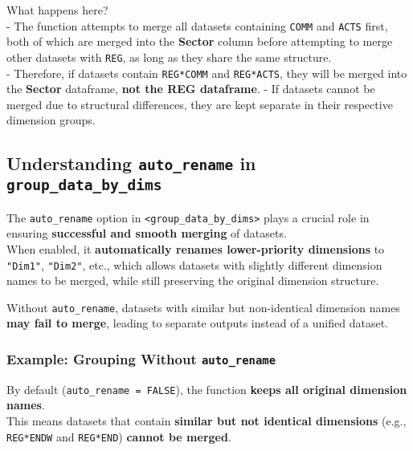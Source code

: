 \documentclass[
]{article}
\begin{document}
What happens here?\\
- The function attempts to merge all datasets containing \texttt{COMM}
and \texttt{ACTS} first, both of which are merged into the
\textbf{Sector} column before attempting to merge other datasets with
\texttt{REG}, as long as they share the same structure.\\
- Therefore, if datasets contain \texttt{REG*COMM} and
\texttt{REG*ACTS}, they will be merged into the \textbf{Sector}
dataframe, \textbf{not the REG dataframe}. - If datasets cannot be
merged due to structural differences, they are kept separate in their
respective dimension groups.

\subsection{\texorpdfstring{\textbf{Understanding \texttt{auto\_rename}
in
\texttt{group\_data\_by\_dims}}}{Understanding auto\_rename in group\_data\_by\_dims}}\label{understanding-auto_rename-in-group_data_by_dims}

The \texttt{auto\_rename} option in
\texttt{\textless{}group\_data\_by\_dims\textgreater{}} plays a crucial
role in ensuring \textbf{successful and smooth merging} of datasets.\\
When enabled, it \textbf{automatically renames lower-priority
dimensions} to \texttt{"Dim1"}, \texttt{"Dim2"}, etc., which allows
datasets with slightly different dimension names to be merged, while
still preserving the original dimension structure.

Without \texttt{auto\_rename}, datasets with similar but non-identical
dimension names \textbf{may fail to merge}, leading to separate outputs
instead of a unified dataset.

\subsubsection{\texorpdfstring{\textbf{Example: Grouping Without
\texttt{auto\_rename}}}{Example: Grouping Without auto\_rename}}\label{example-grouping-without-auto_rename}

By default (\texttt{auto\_rename\ =\ FALSE}), the function \textbf{keeps
all original dimension names}.\\
This means datasets that contain \textbf{similar but not identical
dimensions} (e.g., \texttt{REG*ENDW} and \texttt{REG*END})
\textbf{cannot be merged}.
\end{document}
